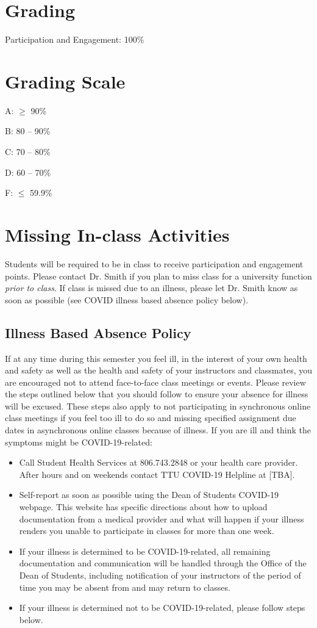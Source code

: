 \documentclass[12pt, notitlepage]{article}   	%
\begin{document}
{\section{Grading}
Participation and Engagement: 100\% \par

\section{Grading Scale}
A: $\geq$ 90\% \par
B: 80 – 90\% \par
C: 70 – 80\% \par
D: 60 – 70\% \par
F: $\leq$ 59.9\% \par

\section{Missing In-class Activities}
Students will be required to be in class to receive participation and engagement points. 
Please contact Dr. Smith if you plan to miss class for a university function 
\textit{prior to class}. If class is missed due to an illness, 
please let Dr. Smith know as soon as possible (see COVID illness based absence policy below).

\subsection{Illness Based Absence Policy}
If at any time during this semester you feel ill, in the interest of your own health and 
safety as well as the health and safety of your instructors and classmates, you are 
encouraged not to attend face-to-face class meetings or events.  Please review the steps 
outlined below that you should follow to ensure your absence for illness will be excused. 
These steps also apply to not participating in synchronous online class meetings if you feel 
too ill to do so and missing specified assignment due dates in asynchronous online classes 
because of illness. If you are ill and think the symptoms might be COVID-19-related:
\begin{itemize}
	\item{Call Student Health Services at 806.743.2848 or your health care provider.  
	After hours and on weekends contact TTU COVID-19 Helpline at [TBA].}
	\item{Self-report as soon as possible using the Dean of Students COVID-19 webpage.
	This website has specific directions about how to upload documentation from a medical 
	provider and what will happen if your illness renders you unable to participate in 
	classes for more than one week.}
	\item{If your illness is determined to be COVID-19-related, all remaining 
	documentation and communication will be handled through the Office of the 
	Dean of Students, including notification of your instructors of the period of 
	time you may be absent from and may return to classes.}
	\item{If your illness is determined not to be COVID-19-related, please follow steps below.}
\end{itemize}

}
\end{document}

